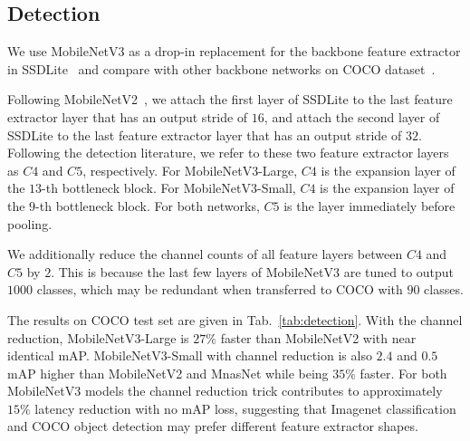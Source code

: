 \documentclass[10pt,twocolumn,letterpaper]{article}
\begin{document}
\subsection{Detection}
%
We use MobileNetV3 as a drop-in replacement for the backbone feature extractor in SSDLite~\cite{mobilenetv2} and compare with other backbone networks on COCO dataset~\cite{COCO}. 

Following MobileNetV2~\cite{mobilenetv2}, we attach the first layer of SSDLite to the last feature extractor layer that has an output stride of $16$, and attach the second layer of SSDLite to the last feature extractor layer that has an output stride of $32$. Following the detection literature, we refer to these two feature extractor layers as $C4$ and $C5$, respectively. For MobileNetV3-Large, $C4$ is the expansion layer of the $13$-th bottleneck block. For MobileNetV3-Small, $C4$ is the expansion layer of the $9$-th bottleneck block. For both networks, $C5$ is the layer immediately before pooling.

We additionally reduce the channel counts of all feature layers between $C4$ and $C5$ by $2$. This is because the last few layers of MobileNetV3 are tuned to output $1000$ classes, which may be redundant when transferred to COCO with $90$ classes. 

The results on COCO test set are given in Tab.~\ref{tab:detection}. With the channel reduction, MobileNetV3-Large is $27\%$ faster than MobileNetV2 with near identical mAP. MobileNetV3-Small with channel reduction is also $2.4$ and $0.5$ mAP higher than MobileNetV2 and MnasNet while being $35\%$ faster. For both MobileNetV3 models the channel reduction trick contributes to approximately $15\%$ latency reduction with no mAP loss, suggesting that Imagenet classification and COCO object detection may prefer different feature extractor shapes.
\end{document}
